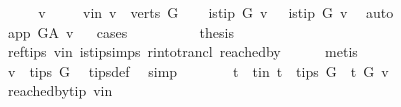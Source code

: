 \begin{isabellebody}
%
\isadelimproof
%
\endisadelimproof
%
\isatagproof
{}\isamarkupfalse%
\ \isanewline
\ \ \isamarkupfalse%
\ v\ \isanewline
\ \ \isamarkupfalse%
\ v{\isacharunderscore}{\kern0pt}in{\isacharcolon}{\kern0pt}\ {\isachardoublequoteopen}v\ {\isasymin}\ verts\ G{\isachardoublequoteclose}\isanewline
\ \ \isamarkupfalse%
\ {\isachardoublequoteopen}is{\isacharunderscore}{\kern0pt}tip\ G\ v{\isachardoublequoteclose}\ {\isacharbar}{\kern0pt}\ {\isachardoublequoteopen}{\isasymnot}\ is{\isacharunderscore}{\kern0pt}tip\ G\ v{\isachardoublequoteclose}\ \isamarkupfalse%
\ auto\isanewline
\ \ \ \ \isamarkupfalse%
\ \isamarkupfalse%
\ {\isachardoublequoteopen}app\ {\isasymrightarrow}\isactrlsup {\isacharplus}{\kern0pt}\isactrlbsub G{\isacharunderscore}{\kern0pt}A\isactrlesub \ v{\isachardoublequoteclose}\isanewline
\ \ \isamarkupfalse%
{\isacharparenleft}{\kern0pt}cases{\isacharparenright}{\kern0pt}\isanewline
\ \ \isamarkupfalse%
\ {}\isanewline
\ \ \isamarkupfalse%
\ \isamarkupfalse%
\ {\isacharquery}{\kern0pt}thesis\ \isamarkupfalse%
\ ref{\isacharunderscore}{\kern0pt}tips\ v{\isacharunderscore}{\kern0pt}in\ is{\isacharunderscore}{\kern0pt}tip{\isachardot}{\kern0pt}simps\ r{\isacharunderscore}{\kern0pt}into{\isacharunderscore}{\kern0pt}trancl{\isacharprime}{\kern0pt}\ reached{\isacharunderscore}{\kern0pt}by\isanewline
\ \ \ \ \isamarkupfalse%
\ {\isacharparenleft}{\kern0pt}metis{\isacharparenright}{\kern0pt}\ \isanewline
\ \ \isamarkupfalse%
\isanewline
\ \ \ \ \isamarkupfalse%
\ {}\isanewline
\ \ \ \ \isamarkupfalse%
\ \isamarkupfalse%
\ {\isachardoublequoteopen}v\ {\isasymnotin}\ tips\ G{\isachardoublequoteclose}\ \isamarkupfalse%
\ tips{\isacharunderscore}{\kern0pt}def\ \isamarkupfalse%
\ simp\isanewline
\ \ \ \ \isamarkupfalse%
\ \isamarkupfalse%
\ t\ \ t{\isacharunderscore}{\kern0pt}in{\isacharcolon}{\kern0pt}\ {\isachardoublequoteopen}t\ {\isasymin}\ tips\ G\ {\isasymand}\ t\ {\isasymrightarrow}\isactrlsup {\isacharplus}{\kern0pt}\isactrlbsub G\isactrlesub \ v{\isachardoublequoteclose}\ \isanewline
\ \ \ \ \ \ \isamarkupfalse%
\ reached{\isacharunderscore}{\kern0pt}by{\isacharunderscore}{\kern0pt}tip\ v{\isacharunderscore}{\kern0pt}in\ \isamarkupfalse%

\end{isabellebody}
